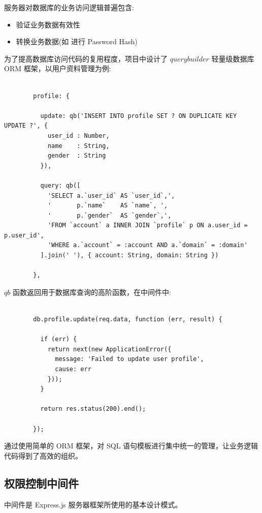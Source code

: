 服务器对数据库的业务访问逻辑普遍包含:

\begin{itemize}
  \item 验证业务数据有效性
  \item 转换业务数据(如 进行 Password Hash)
\end{itemize}

为了提高数据库访问代码的复用程度，项目中设计了 $querybuilder$ 轻量级数据库 ORM 框架，以用户资料管理为例:

\begin{verbatim}

        profile: {

          update: qb('INSERT INTO profile SET ? ON DUPLICATE KEY UPDATE ?', {
            user_id : Number,
            name    : String,
            gender  : String
          }),

          query: qb([
            'SELECT a.`user_id` AS `user_id`,',
            '       p.`name`    AS `name`, ',
            '       p.`gender`  AS `gender`,',
            'FROM `account` a INNER JOIN `profile` p ON a.user_id = p.user_id',
            'WHERE a.`account` = :account AND a.`domain` = :domain'
          ].join(' '), { account: String, domain: String })

        },

\end{verbatim}

$qb$ 函数返回用于数据库查询的高阶函数，在中间件中:

\begin{verbatim}

        db.profile.update(req.data, function (err, result) {

          if (err) {
            return next(new ApplicationError({
              message: 'Failed to update user profile',
              cause: err
            }));
          }

          return res.status(200).end();

        });

\end{verbatim}

通过使用简单的 ORM 框架，对 SQL 语句模板进行集中统一的管理，让业务逻辑代码得到了高效的组织。

\subsection{权限控制中间件}

中间件是 Express.js 服务器框架所使用的基本设计模式。

